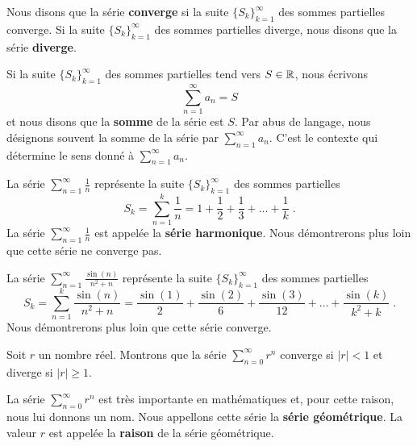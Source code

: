 {\begin{defn}
Nous disons que la série {\bfseries converge}
si la suite $\displaystyle \{S_k\}_{k=1}^\infty$ des sommes partielles
converge.  Si la suite $\{S_k\}_{k=1}^\infty$ des sommes partielles
diverge, nous disons que la série {\bfseries diverge}.

Si la suite $\{S_k\}_{k=1}^\infty$ des sommes partielles tend vers
$S \in \mathbb{R}$, nous écrivons
\[
\sum_{n=1}^\infty a_n = S
\]
et nous disons que la {\bfseries somme} de la série est $S$.  Par abus
de langage, nous désignons souvent la somme de la série par
$\displaystyle \sum_{n=1}^\infty a_n$.  C'est le contexte qui
détermine le sens donné à $\displaystyle \sum_{n=1}^\infty a_n$.
\end{defn}

\begin{egg}
La série $\displaystyle \sum_{n=1}^\infty \frac{1}{n}$ représente la
suite $\{S_k\}_{k=1}^\infty$ des sommes partielles
\[
S_k = \sum_{n=1}^k \frac{1}{n} = 1 + \frac{1}{2} + \frac{1}{3} + \ldots
  + \frac{1}{k} \; .
\]
La série $\displaystyle \sum_{n=1}^\infty \frac{1}{n}$ est appelée la
{\bfseries série harmonique}.
Nous démontrerons plus loin que cette série ne converge pas.

La série $\displaystyle \sum_{n=1}^\infty \frac{\sin(n)}{n^2+n}$
représente la suite $\{S_k\}_{k=1}^\infty$ des sommes partielles
\[
S_k = \sum_{n=1}^k \frac{\sin(n)}{n^2+n}
= \frac{\sin(1)}{2} + \frac{\sin(2)}{6} + \frac{\sin(3)}{12} + \ldots
  + \frac{\sin(k)}{k^2+k} \; .
\]
Nous démontrerons plus loin que cette série converge.
\end{egg}

\begin{egg}
Soit $r$ un nombre réel.  Montrons que la série
$\displaystyle \sum_{n=0}^\infty r^n$ converge si $|r|<1$ et diverge
si $|r|\geq 1$.

La série $\displaystyle \sum_{n=0}^\infty r^n$ est
très importante en mathématiques et, pour cette raison, nous lui donnons
un nom.  Nous appellons cette série la {\bfseries série géométrique}.
 La valeur $r$ est appelée la
{\bfseries raison} de la série géométrique.


\end{egg}}
